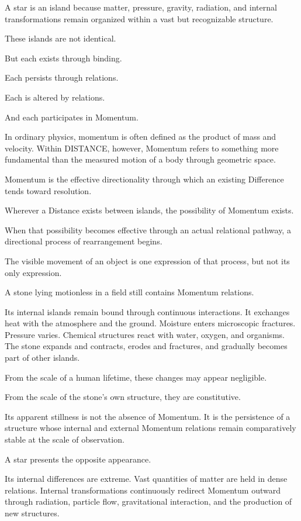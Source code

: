 A star is an island because matter, pressure, gravity, radiation, and internal transformations remain organized within a vast but recognizable structure.

These islands are not identical.

But each exists through binding.

Each persists through relations.

Each is altered by relations.

And each participates in Momentum.

In ordinary physics, momentum is often defined as the product of mass and velocity. Within DISTANCE, however, Momentum refers to something more fundamental than the measured motion of a body through geometric space.

Momentum is the effective directionality through which an existing Difference tends toward resolution.

Wherever a Distance exists between islands, the possibility of Momentum exists.

When that possibility becomes effective through an actual relational pathway, a directional process of rearrangement begins.

The visible movement of an object is one expression of that process, but not its only expression.

A stone lying motionless in a field still contains Momentum relations.

Its internal islands remain bound through continuous interactions. It exchanges heat with the atmosphere and the ground. Moisture enters microscopic fractures. Pressure varies. Chemical structures react with water, oxygen, and organisms. The stone expands and contracts, erodes and fractures, and gradually becomes part of other islands.

From the scale of a human lifetime, these changes may appear negligible.

From the scale of the stone’s own structure, they are constitutive.

Its apparent stillness is not the absence of Momentum. It is the persistence of a structure whose internal and external Momentum relations remain comparatively stable at the scale of observation.

A star presents the opposite appearance.

Its internal differences are extreme. Vast quantities of matter are held in dense relations. Internal transformations continuously redirect Momentum outward through radiation, particle flow, gravitational interaction, and the production of new structures.

